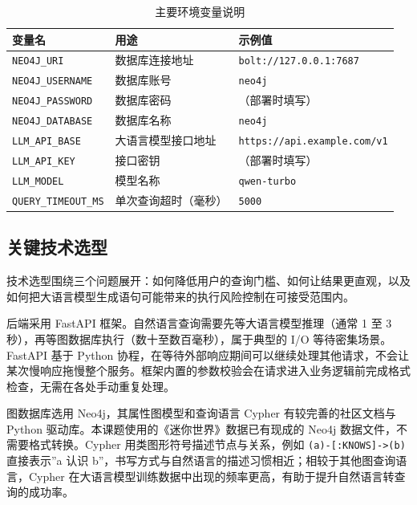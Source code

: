 \documentclass[12pt,a4paper]{article}
\begin{document}
\begin{table}[H]
    \centering
    \caption{主要环境变量说明}
    \label{tab:env-repro}
    \begin{tabular}{lll}
        \toprule
        \textbf{变量名} & \textbf{用途} & \textbf{示例值} \\
        \midrule
        \texttt{NEO4J\_URI} & 数据库连接地址 & \texttt{bolt://127.0.0.1:7687} \\
        \texttt{NEO4J\_USERNAME} & 数据库账号 & \texttt{neo4j} \\
        \texttt{NEO4J\_PASSWORD} & 数据库密码 & （部署时填写） \\
        \texttt{NEO4J\_DATABASE} & 数据库名称 & \texttt{neo4j} \\
        \texttt{LLM\_API\_BASE} & 大语言模型接口地址 & \texttt{https://api.example.com/v1} \\
        \texttt{LLM\_API\_KEY} & 接口密钥 & （部署时填写） \\
        \texttt{LLM\_MODEL} & 模型名称 & \texttt{qwen-turbo} \\
        \texttt{QUERY\_TIMEOUT\_MS} & 单次查询超时（毫秒） & \texttt{5000} \\
        \bottomrule
    \end{tabular}
\end{table}

\subsection{关键技术选型}

技术选型围绕三个问题展开：如何降低用户的查询门槛、如何让结果更直观，以及如何把大语言模型生成语句可能带来的执行风险控制在可接受范围内。

后端采用 FastAPI 框架。自然语言查询需要先等大语言模型推理（通常 1 至 3 秒），再等图数据库执行（数十至数百毫秒），属于典型的 I/O 等待密集场景。FastAPI 基于 Python 协程，在等待外部响应期间可以继续处理其他请求，不会让某次慢响应拖慢整个服务。框架内置的参数校验会在请求进入业务逻辑前完成格式检查，无需在各处手动重复处理\cite{ref6,ref10}。

图数据库选用 Neo4j，其属性图模型和查询语言 Cypher 有较完善的社区文档与 Python 驱动库\cite{ref7,ref12}。本课题使用的《迷你世界》数据已有现成的 Neo4j 数据文件，不需要格式转换。Cypher 用类图形符号描述节点与关系，例如 \texttt{(a)-[:KNOWS]->(b)} 直接表示”a 认识 b”，书写方式与自然语言的描述习惯相近；相较于其他图查询语言，Cypher 在大语言模型训练数据中出现的频率更高，有助于提升自然语言转查询的成功率\cite{ref16}。
\end{document}
